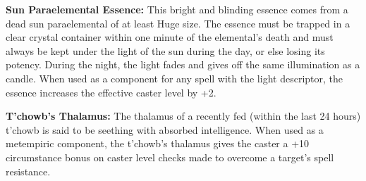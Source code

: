 \textbf{Sun Paraelemental Essence:} This bright and blinding essence comes from a dead sun paraelemental of at least Huge size. The essence must be trapped in a clear crystal container within one minute of the elemental's death and must always be kept under the light of the sun during the day, or else losing its potency. During the night, the light fades and gives off the same illumination as a candle. When used as a component for any spell with the light descriptor, the essence increases the effective caster level by +2.

\textbf{T'chowb's Thalamus:} The thalamus of a recently fed (within the last 24 hours) t'chowb is said to be seething with absorbed intelligence. When used as a metempiric component, the t'chowb's thalamus gives the caster a +10 circumstance bonus on caster level checks made to overcome a target's spell resistance.
